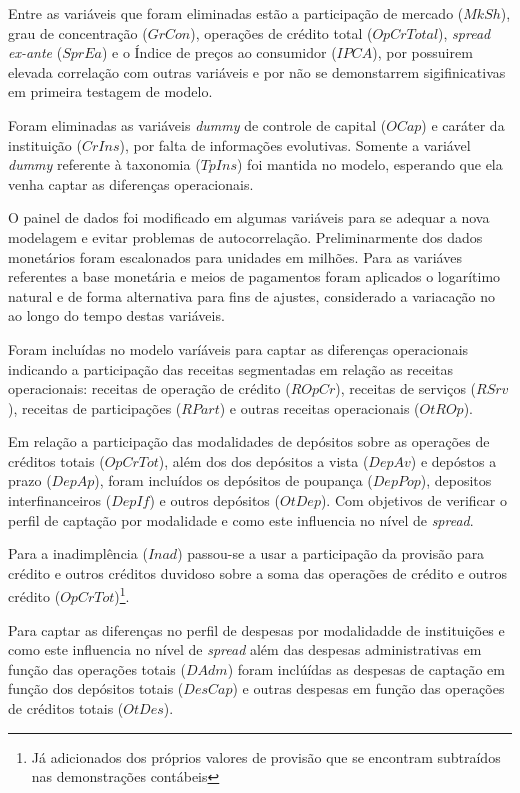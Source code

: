 \documentclass[
  12pt,
  12pt,
  openright,
  oneside,
  a4paper,
  chapter=TITLE,
  section=TITLE,
  subsection=TITLE,
  subsubsection=TITLE,
  english,
  portugues,
  sumario=tradicional]{abntex2}
\begin{document}
Entre as variáveis que foram eliminadas estão a participação de mercado (\(MkSh\)), grau de concentração (\(GrCon\)), operações de crédito total (\(OpCrTotal\)), \emph{spread ex-ante} (\(SprEa\)) e o Índice de preços ao consumidor (\(IPCA\)), por possuirem elevada correlação com outras variáveis e por não se demonstarrem sigifinicativas em primeira testagem de modelo.

Foram eliminadas as variáveis \emph{dummy} de controle de capital (\(OCap\)) e caráter da instituição (\(CrIns\)), por falta de informações evolutivas. Somente a variável \emph{dummy} referente à taxonomia (\(TpIns\)) foi mantida no modelo, esperando que ela venha captar as diferenças operacionais.

O painel de dados foi modificado em algumas variáveis para se adequar a nova modelagem e evitar problemas de autocorrelação. Preliminarmente dos dados monetários foram escalonados para unidades em milhões. Para as variáves referentes a base monetária e meios de pagamentos foram aplicados o logarítimo natural e de forma alternativa para fins de ajustes, considerado a variacação no ao longo do tempo destas variáveis.

Foram incluídas no modelo varíáveis para captar as diferenças operacionais indicando a participação das receitas segmentadas em relação as receitas operacionais: receitas de operação de crédito (\(ROpCr\)), receitas de serviços (\(RSrv\)), receitas de participações (\(RPart\)) e outras receitas operacionais (\(OtROp\)).

Em relação a participação das modalidades de depósitos sobre as operações de créditos totais (\(OpCrTot\)), além dos dos depósitos a vista (\(DepAv\)) e depóstos a prazo (\(DepAp\)), foram incluídos os depósitos de poupança (\(DepPop\)), depositos interfinanceiros (\(DepIf\)) e outros depósitos (\(OtDep\)). Com objetivos de verificar o perfil de captação por modalidade e como este influencia no nível de \emph{spread}.

Para a inadimplência (\(Inad\)) passou-se a usar a participação da provisão para crédito e outros créditos duvidoso sobre a soma das operações de crédito e outros crédito (\(OpCrTot\))\footnote{Já adicionados dos próprios valores de provisão que se encontram subtraídos nas demonstrações contábeis}.

Para captar as diferenças no perfil de despesas por modalidadde de instituições e como este influencia no nível de \emph{spread} além das despesas administrativas em função das operações totais (\(DAdm\)) foram inclúídas as despesas de captação em função dos depósitos totais (\(DesCap\)) e outras despesas em função das operações de créditos totais (\(OtDes\)).
\end{document}
